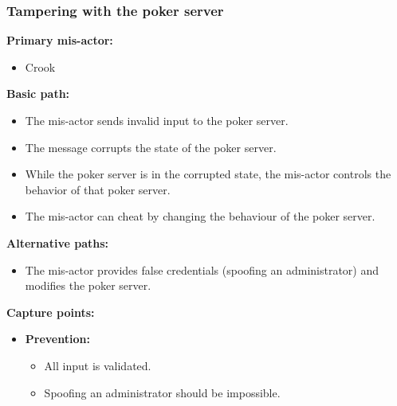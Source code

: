 \documentclass[a4paper,11pt]{report}
\begin{document}
\subsubsection{Tampering with the poker server}
\label{PokerServerCasesT}
\textbf{Primary mis-actor:}
\begin{itemize}
\item Crook
\end{itemize}
\textbf{Basic path:}
\begin{itemize}
\item The mis-actor sends invalid input to the poker server.
\item The message corrupts the state of the poker server.
\item While the poker server is in the corrupted state, the mis-actor controls the behavior of that poker server.
\item The mis-actor can cheat by changing the behaviour of the poker server.
\end{itemize}
\textbf{Alternative paths:}
\begin{itemize}
\item The mis-actor provides false credentials (spoofing an administrator) and modifies the poker server.
\end{itemize}
\textbf{Capture points:}
\begin{itemize}
\item \textbf{Prevention:}
\begin{itemize}
\item All input is validated.
\item Spoofing an administrator should be impossible.
\end{itemize}
\end{itemize}
\end{document}
